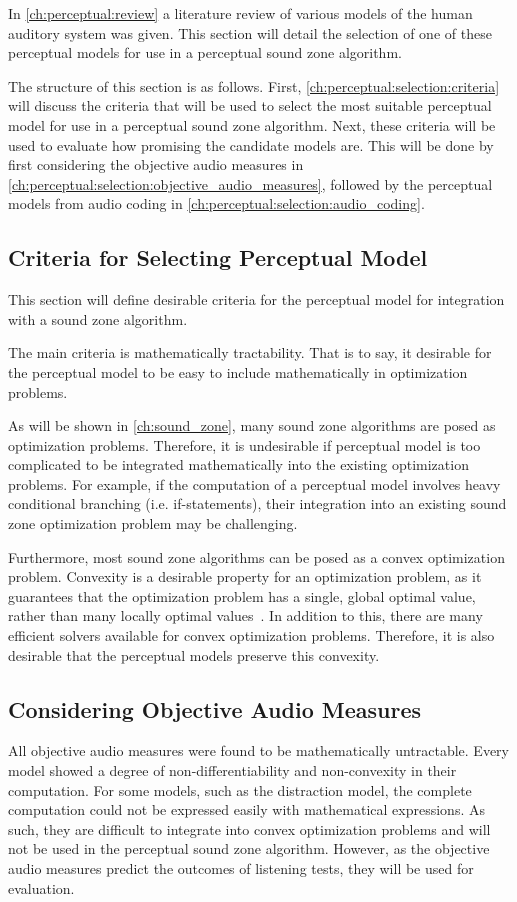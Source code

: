 In \autoref{ch:perceptual:review} a literature review of various models of the human auditory system was given.
This section will detail the selection of one of these perceptual models for use in a perceptual sound zone algorithm.

The structure of this section is as follows.
First, \autoref{ch:perceptual:selection:criteria} will discuss the criteria that will be used to select the most suitable perceptual model for use in 
a perceptual sound zone algorithm.
Next, these criteria will be used to evaluate how promising the candidate models are.
This will be done by first considering the objective audio measures in \autoref{ch:perceptual:selection:objective_audio_measures}, 
followed by the perceptual models from audio coding in \autoref{ch:perceptual:selection:audio_coding}.

\subsection{Criteria for Selecting Perceptual Model}
\label{ch:perceptual:selection:criteria}
This section will define desirable criteria for the perceptual model for integration with a sound zone algorithm.

The main criteria is mathematically tractability.
That is to say, it desirable for the perceptual model to be easy to include mathematically in optimization problems.

As will be shown in \autoref{ch:sound_zone}, many sound zone algorithms are posed as optimization problems.
Therefore, it is undesirable if perceptual model is too complicated to be integrated mathematically into the existing optimization problems.
For example, if the computation of a perceptual model involves heavy conditional branching (i.e. if-statements), their
integration into an existing sound zone optimization problem may be challenging.

Furthermore, most sound zone algorithms can be posed as a convex optimization problem.
Convexity is a desirable property for an optimization problem, as it guarantees that the optimization problem has a single, 
global optimal value, rather than many locally optimal values~\cite{boyd2004convex}. 
In addition to this, there are many efficient solvers available for convex optimization problems.
Therefore, it is also desirable that the perceptual models preserve this convexity.

\subsection{Considering Objective Audio Measures}
\label{ch:perceptual:selection:objective_audio_measures}
All objective audio measures were found to be mathematically untractable. 
Every model showed a degree of non-differentiability and non-convexity in their computation.
For some models, such as the distraction model, the complete computation could not be expressed easily with mathematical expressions.
As such, they are difficult to integrate into convex optimization problems and will not be used in the perceptual sound zone algorithm.
However, as the objective audio measures predict the outcomes of listening tests, they will be used for evaluation.


